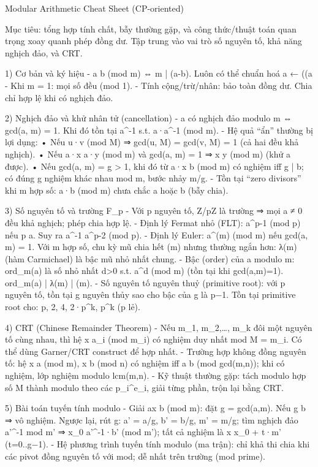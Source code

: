 Modular Arithmetic Cheat Sheet (CP-oriented)

Mục tiêu: tổng hợp tính chất, bẫy thường gặp, và công thức/thuật toán quan trọng xoay quanh phép đồng dư. Tập trung vào vai trò số nguyên tố, khả năng nghịch đảo, và CRT.

1) Cơ bản và ký hiệu
- a \equiv b (mod m) ⇔ m | (a-b). Luôn có thể chuẩn hoá a ← ((a %
- Khi m = 1: mọi số đều  (mod 1).
- Tính cộng/trừ/nhân: bảo toàn đồng dư. Chia chỉ hợp lệ khi có nghịch đảo.

2) Nghịch đảo và khử nhân tử (cancellation)
- a có nghịch đảo modulo m ⇔ gcd(a, m) = 1. Khi đó tồn tại a^{-1} s.t. a·a^{-1}  (mod m).
- Hệ quả “ẩn” thường bị lợi dụng:
  • Nếu u·v  (mod M) ⇒ gcd(u, M) = gcd(v, M) = 1 (cả hai đều khả nghịch).
  • Nếu a·x \equiv a·y (mod m) và gcd(a, m) = 1 ⇒ x \equiv y (mod m) (khử a được).
  • Nếu gcd(a, m) = g > 1, khi đó từ a·x \equiv b (mod m) có nghiệm iff g | b; có đúng g nghiệm khác nhau mod m, bước nhảy m/g.
- Tồn tại “zero divisors” khi m hợp số: a·b  (mod m) chưa chắc a  hoặc b  (bẫy chia).

3) Số nguyên tố và trường F_p
- Với p nguyên tố, Z/pZ là trường ⇒ mọi a ≠ 0 đều khả nghịch; phép chia hợp lệ.
- Định lý Fermat nhỏ (FLT): a^{p-1}  (mod p) nếu p \nmid a. Suy ra a^{-1} \equiv a^{p-2} (mod p).
- Định lý Euler: a^{\varphi(m)}  (mod m) nếu gcd(a, m) = 1. Với m hợp số, chu kỳ mũ chia hết \varphi(m) nhưng thường ngắn hơn: λ(m) (hàm Carmichael) là bậc mũ nhỏ nhất chung.
- Bậc (order) của a modulo m: ord_m(a) là số nhỏ nhất d>0 s.t. a^d  (mod m) (tồn tại khi gcd(a,m)=1). ord_m(a) | λ(m) | \varphi(m).
- Số nguyên tố nguyên thuỷ (primitive root): với p nguyên tố, tồn tại g nguyên thủy sao cho bậc của g là p−1. Tồn tại primitive root cho: p, 2, 4, 2·p^k, p^k (p lẻ).

4) CRT (Chinese Remainder Theorem)
- Nếu m_1, m_2,…, m_k đôi một nguyên tố cùng nhau, thì hệ x \equiv a_i (mod m_i) có nghiệm duy nhất mod M = \prod m_i. Có thể dùng Garner/CRT construct để hợp nhất.
- Trường hợp không đồng nguyên tố: hệ x \equiv a (mod m), x \equiv b (mod n) có nghiệm iff a \equiv b (mod gcd(m,n)); khi có nghiệm, lớp nghiệm modulo lcm(m,n).
- Kỹ thuật thường gặp: tách modulo hợp số M thành modulo theo các p_i^{e_i}, giải từng phần, trộn lại bằng CRT.

5) Bài toán tuyến tính modulo
- Giải ax \equiv b (mod m): đặt g = gcd(a,m). Nếu g \nmid b ⇒ vô nghiệm. Ngược lại, rút g: a' = a/g, b' = b/g, m' = m/g; tìm nghịch đảo a'^{-1} mod m' ⇒ x_0 \equiv a'^{-1}·b' (mod m'); tất cả nghiệm là x \equiv x_0 + t·m' (t=0..g−1).
- Hệ phương trình tuyến tính modulo (ma trận): chỉ khả thi chia khi các pivot đồng nguyên tố với mod; dễ nhất trên trường (mod prime).


